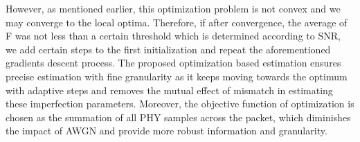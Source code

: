 However, as mentioned earlier, this optimization problem is not convex and we may converge to the local optima. Therefore, if after convergence, the average of F was not less than a certain threshold which is determined according to SNR, we add certain steps to the first initialization and repeat the aforementioned gradients descent process. The proposed optimization based estimation ensures precise estimation with fine granularity as it keeps moving towards the optimum with adaptive steps and removes the mutual effect of mismatch in estimating these imperfection parameters. Moreover, the objective function of optimization is chosen as the summation of all PHY samples across the packet, which diminishes the impact of AWGN and provide more robust information and granularity.

